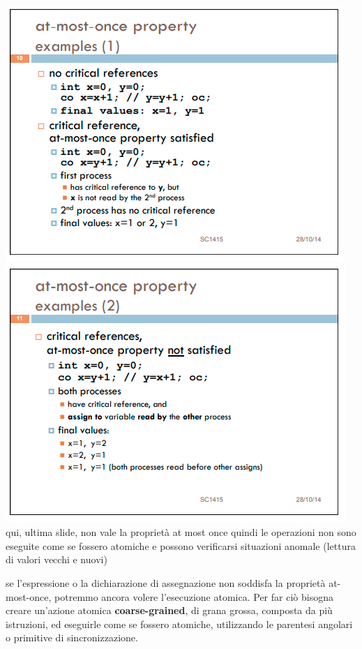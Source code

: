 \documentclass[10pt,a4paper]{book}
\begin{document}
\includegraphics[scale=0.65]{img/mostonce.png} \\
\includegraphics[scale=0.65]{img/mostonce2.png} 
qui, ultima slide, non vale la proprietà at most once quindi le operazioni non sono eseguite come se fossero atomiche e possono verificarsi situazioni anomale (lettura di valori vecchi e nuovi)

se l'espressione o la dichiarazione di assegnazione non soddisfa
la proprietà at-most-once, potremmo ancora volere l'esecuzione atomica. Per far ciò bisogna creare un'azione atomica \textbf{coarse-grained}, di grana grossa, composta da più istruzioni, ed eseguirle come se fossero atomiche, utilizzando le parentesi angolari o primitive di sincronizzazione.
\end{document}
